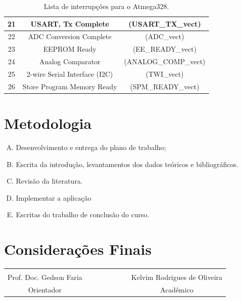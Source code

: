 \documentclass[a4paper,12pt,portuguese]{ufms-cpcx}
\begin{document}
\begin{table}[!h]
\begin{tabular}{|c|cc|}
		21 &               USART, Tx Complete                &   (USART_TX_vect)   \\ \hline
		22 &             ADC Conversion Complete             &     (ADC_vect)      \\ \hline
		23 &                  EEPROM Ready                   &   (EE_READY_vect)   \\ \hline
		24 &                Analog Comparator                & (ANALOG_COMP_vect)  \\ \hline
		25 &         2-wire Serial Interface  (I2C)          &     (TWI_vect)      \\ \hline
		26 &           Store Program Memory Ready            &  (SPM_READY_vect)   \\ \hline
	\end{tabular}
	\caption[Lista de interrupções]{Lista de interrupções para o Atmega328.}
	\label{Tab:interrupcoes}
\end{table}



\chapter{Metodologia} \label{cap: metodologia}

\begin{enumerate}[(A)]
	
	\item Desenvolvimento e entrega do plano de trabalho;
	\item Escrita da introdução, levantamentos dos dados teóricos e bibliográficos.
	\item Revisão da literatura. 
	\item Implementar a aplicação
	\item Escritas do trabalho de conclusão do curso.		
	
	
\end{enumerate}

\chapter{Considerações Finais}


\vskip 10cm
\begin{table}[!h]
	\renewcommand{\arraystretch}{1.3}
	\centering
	\begin{tabular}{cccccccc}
		& & & & & & & \\
		Prof. Doc. Gedson Faria & & & & & & & Kelvim Rodrigues de Oliveira \\
		Orientador & & & & & & & Acadêmico \\
	\end{tabular}
\end{table}
\end{document}
